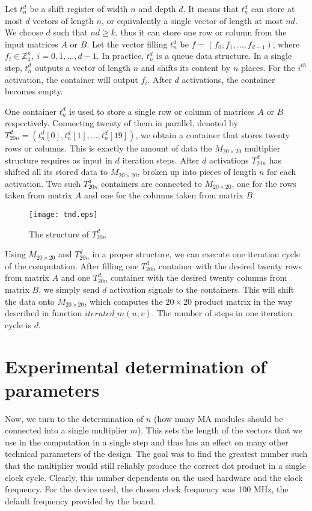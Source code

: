 \documentclass[11pt,twoside]{article}
\begin{document}
Let $t_{n}^{d}$ be a shift register of width $n$ and depth $d$. It means that $t_{n}^{d}$ can store at most $d$ vectors of length $n$, or equivalently a single vector of length at most $nd$. We choose $d$ such that $nd \geq k$, thus it can store one row or column from the input matrices $A$ or $B$. Let the vector filling $t_{n}^{d}$ be $f=(f_{0},f_{1},\ldots, f_{d-1})$, where $f_{i} \in \mathbb{Z}_{4}^{n}, \ i=0,1,\ldots,d-1$. In practice, $t_{n}^{d}$ is a queue data structure. In a single step, $t_{n}^{d}$ outputs a vector of length $n$ and shifts its content by $n$ places. For the $i^{th}$ activation, the container will output $f_{i}$.  After $d$ activations, the container becomes empty.

One container $t_{n}^{d}$ is used to store a single row or column of matrices $A$ or $B$ respectively. Connecting twenty of them in parallel, denoted by $T_{20n}^{d}=(t_{n}^{d}[0],t_{n}^{d}[1],\ldots,t_{n}^{d}[19])$, we obtain a container that stores twenty rows or column\-s. This is exactly the amount of data the $M_{20 \times 20}$ multiplier structure requires as input in $d$ iteration steps. After $d$ activations $T_{20n}^{d}$ has shifted all its stored data to $M_{20 \times 20}$, broken up into pieces of length $n$ for each activation. Two such $T_{20n}^{d}$ containers are connected to $M_{20 \times 20}$, one for the rows taken from matrix $A$ and one for the columns taken from matrix $B$.

\begin{figure}[h!]
\centering
\texttt{[image: tnd.eps]}
\caption{The structure of $T_{20n}^{d}$}
\end{figure}

Using $M_{20 \times 20}$ and $T_{20n}^d$ in a proper structure, we can execute one iteration cycle of the computation. After filling one $T_{20n}^{d}$ container with the desired twenty rows from matrix $A$ and one $T_{20n}^{d}$ container with the desired twenty columns from matrix $B$, we simply send $d$ activation signals to the containers. This will shift the data onto $M_{20 \times 20}$, which computes the $20 \times 20$ product matrix in the way described in function $iterated\_m(u,v)$. The number of steps in one iteration cycle is $d$.

\section{Experimental determination of parameters}

Now, we turn to the determination of $n$ (how many MA modules should be connected into a single multiplier $m$). This sets the length of the vectors that we use in the computation in a single step and thus has an effect on many other technical parameters of the design. The goal was to find the greatest number such that the multiplier would still reliably produce the correct dot product in a single clock cycle. Clearly, this number dependents on the used hardware and the clock frequency. For the device used, the chosen clock frequency was 100 MHz, the default frequency provided by the board.
\end{document}
